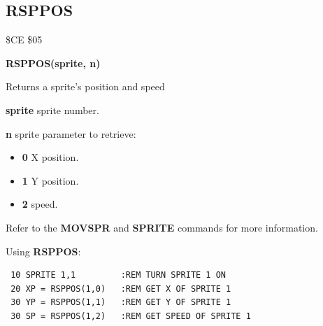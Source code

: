 \subsection{RSPPOS}
\begin{description}[leftmargin=2cm,style=nextline]
\item [Token:] \$CE \$05
\item [Format:] {\bf RSPPOS(sprite, n)}
\item [Usage:]  Returns a sprite's position and speed

                {\bf sprite} sprite number.

                {\bf n} sprite parameter to retrieve:

                \begin{itemize}
                    \item {\bf 0} X position.
                    \item {\bf 1} Y position.
                    \item {\bf 2} speed.
                \end{itemize}

\item [Remarks:] Refer to the {\bf MOVSPR} and {\bf SPRITE} commands for more information.

\item [Example:] Using {\bf RSPPOS}:
\begin{tcolorbox}[colback=black,coltext=white]
\verbatimfont{\codefont}
\begin{verbatim}
 10 SPRITE 1,1         :REM TURN SPRITE 1 ON
 20 XP = RSPPOS(1,0)   :REM GET X OF SPRITE 1
 30 YP = RSPPOS(1,1)   :REM GET Y OF SPRITE 1
 30 SP = RSPPOS(1,2)   :REM GET SPEED OF SPRITE 1
\end{verbatim}
\end{tcolorbox}
\end{description}


\newpage
